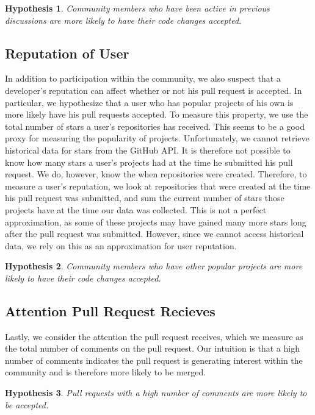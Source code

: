\documentclass[12pt]{article}
\newtheorem{hyp}{Hypothesis}
\begin{document}
\begin{hyp}
Community members who have been active in previous discussions are more likely
to have their code changes accepted.
\end{hyp}

\subsection{Reputation of User}
In addition to participation within the community, we also suspect that a
developer's reputation can affect whether or not his pull request is accepted.
In particular, we hypothesize that a user who has popular projects of his own is
more likely have his pull requests accepted. To measure this property, we use
the total number of stars a user's repositories has received. This seems to be a
good proxy for measuring the popularity of projects. Unfortunately, we cannot
retrieve historical data for stars from the GitHub API. It is therefore not
possible to know how many stars a user's projects had at the time he submitted
his pull request. We do, however, know the when repositories were created.
Therefore, to measure a user's reputation, we look at repositories that were
created at the time his pull request was submitted, and sum the current number
of stars those projects have at the time our data was collected. This is not a
perfect approximation, as some of these projects may have gained many more stars
long after the pull request was submitted. However, since we cannot access
historical data, we rely on this as an approximation for user reputation.

\begin{hyp}
Community members who have other popular projects are more likely to have their
code changes accepted.
\end{hyp}

\subsection{Attention Pull Request Recieves}
Lastly, we consider the attention the pull request receives, which we measure as
the total number of comments on the pull request. Our intuition is that a high
number of comments indicates the pull request is generating interest within the
community and is therefore more likely to be merged.

\begin{hyp}
Pull requests with a high number of comments are more likely to be accepted.
\end{hyp}
\end{document}
